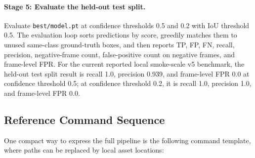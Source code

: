 \documentclass[11pt]{article}
\begin{document}
\paragraph{Stage 5: Evaluate the held-out test split.}
Evaluate \texttt{best/model.pt} at confidence thresholds 0.5 and 0.2 with IoU threshold 0.5. The evaluation loop sorts predictions by score, greedily matches them to unused same-class ground-truth boxes, and then reports TP, FP, FN, recall, precision, negative-frame count, false-positive count on negative frames, and frame-level FPR. For the current reported local smoke-scale v5 benchmark, the held-out test split result is recall 1.0, precision 0.939, and frame-level FPR 0.0 at confidence threshold 0.5; at confidence threshold 0.2, it is recall 1.0, precision 1.0, and frame-level FPR 0.0.

\subsection{Reference Command Sequence}
One compact way to express the full pipeline is the following command template, where paths can be replaced by local asset locations:
\end{document}
